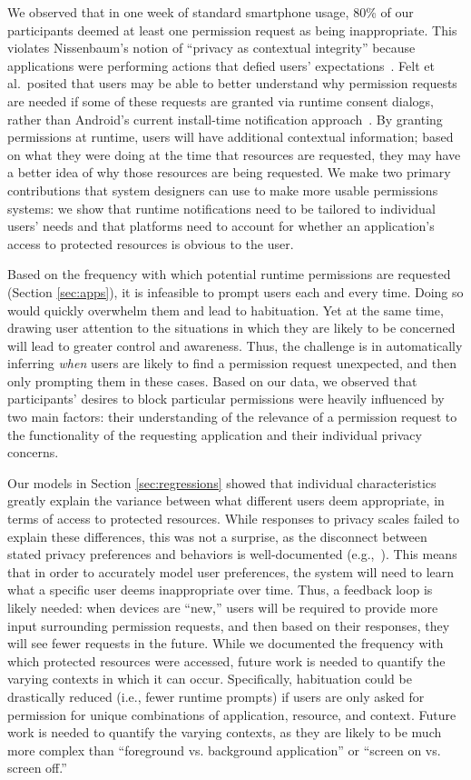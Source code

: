 \documentclass[letterpaper,twocolumn,10pt]{article}
\begin{document}
We observed that in one week of standard smartphone usage, 80\% of our participants deemed at least one permission request as being inappropriate. This violates Nissenbaum's notion of ``privacy as contextual integrity'' because applications were performing actions that defied users' expectations~\cite{nissenbaum2009privacy}. Felt et al.\ posited that users may be able to better understand why permission requests are needed if some of these requests are granted via runtime consent dialogs, rather than Android's current install-time notification approach~\cite{Felt2012b}. By granting permissions at runtime, users will have additional contextual information; based on what they were doing at the time that resources are requested, they may have a better idea of why those resources are being requested. We make two primary contributions that system designers can use to make more usable permissions systems: we show that runtime notifications need to be tailored to individual users' needs and that platforms need to account for whether an application's access to protected resources is obvious to the user.

Based on the frequency with which potential runtime permissions are requested (Section \ref{sec:apps}), it is infeasible to prompt users each and every time. Doing so would quickly overwhelm them and lead to habituation. Yet at the same time, drawing user attention to the situations in which they are likely to be concerned will lead to greater control and awareness. Thus, the challenge is in automatically inferring {\it when} users are likely to find a permission request unexpected, and then only prompting them in these cases. Based on our data, we observed that participants' desires to block particular permissions were heavily influenced by two main factors: their understanding of the relevance of a permission request to the functionality of the requesting application and their individual privacy concerns.

Our models in Section \ref{sec:regressions} showed that individual characteristics greatly explain the variance between what different users deem appropriate, in terms of access to protected resources. While responses to privacy scales failed to explain these differences, this was not a surprise, as the disconnect between stated privacy preferences and behaviors is well-documented (e.g.,~\cite{Acquisti05}). This means that in order to accurately model user preferences, the system will need to learn what a specific user deems inappropriate over time. Thus, a feedback loop is likely needed: when devices are ``new,'' users will be required to provide more input surrounding permission requests, and then based on their responses, they will see fewer requests in the future. While we documented the frequency with which protected resources were accessed, future work is needed to quantify the varying contexts in which it can occur. Specifically, habituation could be drastically reduced (i.e., fewer runtime prompts) if users are only asked for permission for unique combinations of application, resource, and context. Future work is needed to quantify the varying contexts, as they are likely to be much more complex than ``foreground vs. background application'' or ``screen on vs. screen off.''
\end{document}
